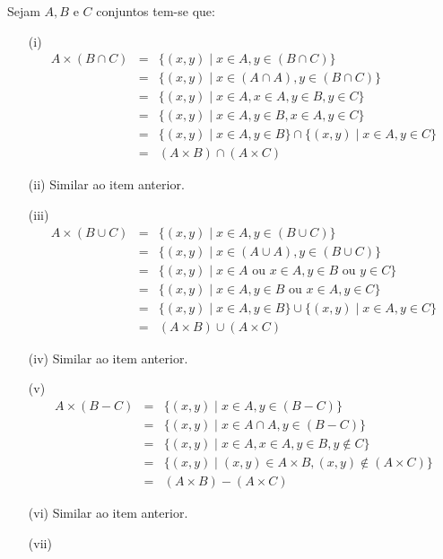 \begin{prova}
	Sejam $A, B$ e $C$ conjuntos tem-se que:
	\begin{itemize}
		\item[(i)] 
		\begin{eqnarray*}
			A \times (B \cap C) & = & \{(x, y) \mid x \in A, y \in (B \cap C)\}\\
			& = & \{(x, y) \mid x \in (A \cap A), y \in (B \cap C)\}\\
			& = & \{(x, y) \mid x \in A, x \in A, y \in B, y \in C\}\\
			& = & \{(x, y) \mid x \in A, y \in B, x \in A, y \in C\}\\
			& = & \{(x, y) \mid x \in A, y \in B\} \cap \{(x, y) \mid x \in A, y \in C\}\\
			& = & (A \times B) \cap (A \times C)
		\end{eqnarray*}
		\item[(ii)] Similar ao item anterior.
		\item[(iii)]
		\begin{eqnarray*}
			A \times (B \cup C) & = & \{(x, y) \mid x \in A, y \in (B \cup C)\}\\
			& = & \{(x, y) \mid x \in (A \cup A), y \in (B \cup C)\}\\
			& = & \{(x, y) \mid x \in A \text{ ou } x \in A, y \in B \text{ ou } y \in C\}\\
			& = & \{(x, y) \mid x \in A, y \in B \text{ ou } x \in A, y \in C\}\\
			& = & \{(x, y) \mid x \in A, y \in B\} \cup \{(x, y) \mid x \in A, y \in C\}\\
			& = & (A \times B) \cup (A \times C)
		\end{eqnarray*}
		\item[(iv)] Similar ao item anterior.
		\item[(v)]
		\begin{eqnarray*}
			A \times (B - C) & = & \{(x, y) \mid x \in A, y \in (B-C)\}\\
			& = & \{(x, y) \mid x \in A \cap A, y \in (B-C)\}\\
			& = & \{(x, y) \mid x \in A, x \in A, y \in B, y \notin C\}\\
			& = & \{(x, y) \mid (x, y) \in A \times B, (x, y) \notin (A \times  C)\}\\
			& = & (A \times B) - (A \times C)
		\end{eqnarray*}
		\item[(vi)] Similar ao item anterior.
		\item[(vii)]

\end{itemize}
\end{prova}
